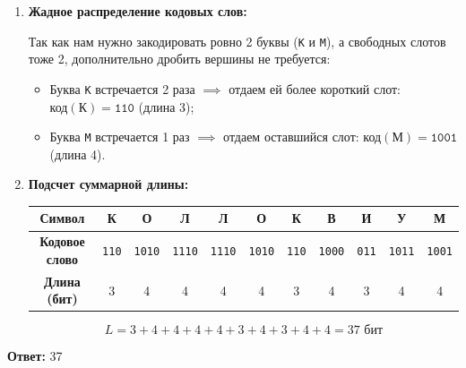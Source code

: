 \documentclass[11pt,a4paper]{article}
\begin{document}
\begin{enumerate}
\begin{center}
    \end{center}

    По дереву видно:
    \begin{itemize}
        \item Ветвь \texttt{0} закрыта полностью (свободных вершин нет).
        \item В ветви \texttt{1} образовалось ровно \textbf{два свободных листа}: \texttt{110} (глубина 3) и \texttt{1001} (глубина 4).
    \end{itemize}

    \item \textbf{Жадное распределение кодовых слов:}
    
    Так как нам нужно закодировать ровно 2 буквы (\texttt{К} и \texttt{М}), а свободных слотов тоже 2, дополнительно дробить вершины не требуется:
    \begin{itemize}
        \item Буква \texttt{К} встречается 2 раза $\implies$ отдаем ей более короткий слот: \quad $\text{код}(\texttt{К}) = \texttt{110}$ (длина 3);
        \item Буква \texttt{М} встречается 1 раз $\implies$ отдаем оставшийся слот: \quad $\text{код}(\texttt{М}) = \texttt{1001}$ (длина 4).
    \end{itemize}

    \item \textbf{Подсчет суммарной длины:}
    
    \begin{center}
    \begin{tabular}{|c|c|c|c|c|c|c|c|c|c|c|}
    \hline
    \textbf{Символ} & К & О & Л & Л & О & К & В & И & У & М \\ \hline
    \textbf{Кодовое слово} & \texttt{110} & \texttt{1010} & \texttt{1110} & \texttt{1110} & \texttt{1010} & \texttt{110} & \texttt{1000} & \texttt{011} & \texttt{1011} & \texttt{1001} \\ \hline
    \textbf{Длина (бит)} & 3 & 4 & 4 & 4 & 4 & 3 & 4 & 3 & 4 & 4 \\ \hline
    \end{tabular}
    \end{center}

    $$L = 3 + 4 + 4 + 4 + 4 + 3 + 4 + 3 + 4 + 4 = 37 \text{ бит}$$
\end{enumerate}

\textbf{Ответ:} 37
\end{document}
